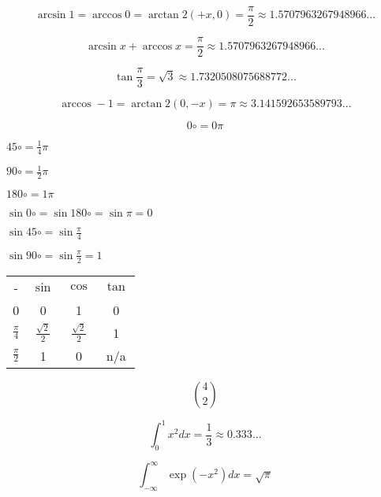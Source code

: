 \documentclass{article}
\begin{document}
$$\arcsin1 = \arccos0 = \arctan2(+x,0) = \frac{\pi}{2}\approx1.5707963267948966...$$

$$\arcsin x + \arccos x = \frac{\pi}{2} \approx1.5707963267948966...$$

$$\tan\frac{\pi}{3}=\sqrt{3}\approx1.7320508075688772...$$

$$\arccos-1 = \arctan2(0,-x) = \pi\approx3.141592653589793...$$



$$0\circ = 0\pi$$

$45\circ = \frac{1}{4}\pi$

$90\circ = \frac{1}{2}\pi$

$180\circ = 1\pi$

$\sin 0\circ = \sin 180\circ = \sin\pi = 0$

$\sin 45\circ = \sin\frac{\pi}{4}$

$\sin 90\circ = \sin\frac{\pi}{2} = 1$

\begin{tabular}{c c c c}
-               & $\sin$               & $\cos$               & $\tan$\\
0               & 0                    & 1                    & 0\\
$\frac{\pi}{4}$ & $\frac{\sqrt{2}}{2}$ & $\frac{\sqrt{2}}{2}$ & 1\\
$\frac{\pi}{2}$ & 1                    & 0                    & n/a
\end{tabular}

$$\binom{4}{2}$$

$$\int_0^1x^2dx=\frac{1}{3}\approx0.333...$$

$$\int_{-\infty}^\infty\exp(-x^2)dx = \sqrt{\pi}$$
\end{document}
